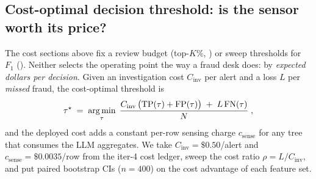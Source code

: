 \subsection{Cost-optimal decision threshold: is the sensor worth its price?}
\label{sec:p8-evidence-cost-optimal}

The cost sections above fix a review budget (top-$K\%$,
) or sweep thresholds for
$F_1$ (). Neither selects the
operating point the way a fraud desk does: by \emph{expected dollars per
decision}. Given an investigation cost $C_{\text{inv}}$ per alert and a
loss $L$ per \emph{missed} fraud, the cost-optimal threshold is
\begin{equation}
\tau^\star \;=\; \operatorname*{arg\,min}_{\tau}\;
  \frac{C_{\text{inv}}\,\big(\mathrm{TP}(\tau)+\mathrm{FP}(\tau)\big)
        \;+\; L\,\mathrm{FN}(\tau)}{N}\; ,
\label{eq:p8-tau-star}
\end{equation}
and the deployed cost adds a constant per-row sensing charge
$c_{\text{sense}}$ for any tree that consumes the LLM aggregates. We take
$C_{\text{inv}}=\$0.50$/alert and $c_{\text{sense}}=\$0.0035$/row from the
iter-4 cost ledger, sweep the cost ratio $\rho = L/C_{\text{inv}}$, and put
paired bootstrap CIs ($n{=}400$) on the cost advantage of each feature set.

